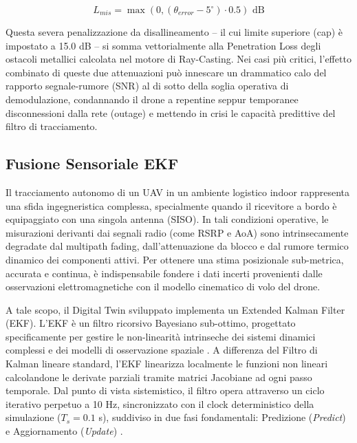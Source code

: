 \documentclass[twoside]{article}
\begin{document}
\begin{equation}
L_{mis} = \max\left(0, (\theta_{error} - 5^\circ) \cdot 0.5 \right) \text{ dB}
\label{eq:beam_misalignment_loss}
\end{equation}

Questa severa penalizzazione da disallineamento -- il cui limite superiore (cap) è impostato a 15.0 dB -- si somma vettorialmente alla Penetration Loss degli ostacoli metallici calcolata nel motore di Ray-Casting. Nei casi più critici, l'effetto combinato di queste due attenuazioni può innescare un drammatico calo del rapporto segnale-rumore (SNR) al di sotto della soglia operativa di demodulazione, condannando il drone a repentine seppur temporanee disconnessioni dalla rete (outage) e mettendo in crisi le capacità predittive del filtro di tracciamento.


\subsection{Fusione Sensoriale EKF}

Il tracciamento autonomo di un UAV in un ambiente logistico indoor rappresenta una sfida ingegneristica complessa, specialmente quando il ricevitore a bordo è equipaggiato con una singola antenna (SISO). In tali condizioni operative, le misurazioni derivanti dai segnali radio (come RSRP e AoA) sono intrinsecamente degradate dal multipath fading, dall'attenuazione da blocco e dal rumore termico dinamico dei componenti attivi. Per ottenere una stima posizionale sub-metrica, accurata e continua, è indispensabile fondere i dati incerti provenienti dalle osservazioni elettromagnetiche con il modello cinematico di volo del drone.

A tale scopo, il Digital Twin sviluppato implementa un Extended Kalman Filter (EKF). L'EKF è un filtro ricorsivo Bayesiano sub-ottimo, progettato specificamente per gestire le non-linearità intrinseche dei sistemi dinamici complessi e dei modelli di osservazione spaziale \cite{Ye2023}. A differenza del Filtro di Kalman lineare standard, l'EKF linearizza localmente le funzioni non lineari calcolandone le derivate parziali tramite matrici Jacobiane ad ogni passo temporale. Dal punto di vista sistemistico, il filtro opera attraverso un ciclo iterativo perpetuo a 10 Hz, sincronizzato con il clock deterministico della simulazione ($T_s= 0.1$ s), suddiviso in due fasi fondamentali: Predizione (\textit{Predict}) e Aggiornamento (\textit{Update}) \cite{Ye2023}.
\end{document}
